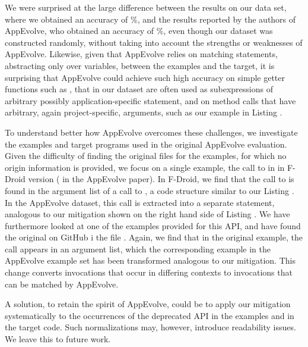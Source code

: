 We were surprised at the large difference between the results on our data
set, where we obtained an accuracy  of \%, and the
results reported by the authors of AppEvolve, who obtained an accuracy of
\%, even though our dataset was constructed randomly, without
taking into account the strengths or weaknesses of AppEvolve.  Likewise,
given that AppEvolve relies on matching statements, abstracting only over
variables, between the examples and the target, it is surprising that
AppEvolve could achieve such high accuracy on simple getter functions such
as , that in our dataset are often used as
subexpressions of arbitrary possibly application-specific statement, and on
method calls that have arbitrary, again project-specific, arguments, such
as our example in Listing .

To understand better how AppEvolve overcomes these challenges, we
investigate the examples and target programs used in the original AppEvolve
evaluation.  Given the difficulty of finding the original files for the
examples, for which no origin information is provided, we focus on a single
example, the call to  in  in F-Droid
version  ( in the AppEvolve paper).  In F-Droid, we
find that the call to  is found in the argument list
of a call to , a code structure similar to our Listing
.  In the AppEvolve dataset, this call is extracted into a
separate statement, analogous to our mitigation shown on the right hand
side of Listing .  We have furthermore looked at one of the
examples provided for this API, and have found the original on GitHub i the
file .  Again, we find that in the original example, the call
appears in an argument list, which the corresponding example in the
AppEvolve example set has been transformed analogous to our mitigation.
This change converts invocations that occur in differing contexts to
invocations that can be matched by AppEvolve.

A solution, to retain the spirit of AppEvolve, could be to apply our
mitigation systematically to the occurrences of the deprecated API in the
examples and in the target code.  Such normalizations may, however,
introduce readability issues.  We leave this to future work.



